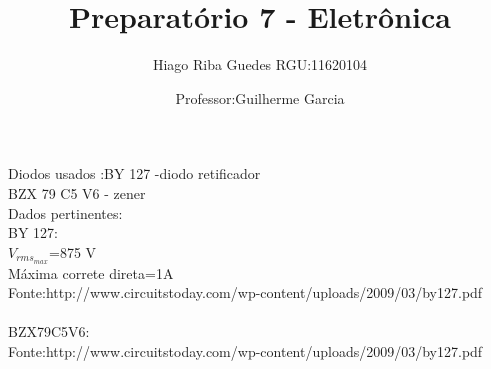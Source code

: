 \documentclass[11pt,a4paper]{article}
\title{Preparatório 7 - Eletrônica}
\author{Hiago Riba Guedes RGU:11620104}
\date{Professor:Guilherme Garcia}
\begin{document}
\maketitle
Diodos usados :BY 127 -diodo retificador\\
BZX 79 C5 V6 - zener\\
Dados pertinentes:\\
BY 127:\\
$V_{rms_{max}}$=875 V\\
Máxima correte direta=1A\\
Fonte:http://www.circuitstoday.com/wp-content/uploads/2009/03/by127.pdf\\
\\
BZX79C5V6:\\
Fonte:http://www.circuitstoday.com/wp-content/uploads/2009/03/by127.pdf
\end{document}
